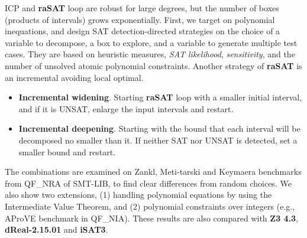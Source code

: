 \documentclass[runningheads,a4paper,oribibl]{llncs}
\newcommand{\suppress}[1]{} %
\begin{document}
ICP and {\bf raSAT} loop are robust for large degrees, but the number of boxes (products of intervals) 
grows exponentially. 
First, we target on polynomial inequations, and design SAT detection-directed strategies on 
the choice of a variable to decompose, a box to explore, and a variable to generate multiple test cases. 
They are based on heuristic measures, {\em SAT likelihood}, {\em sensitivity}, and the number of 
unsolved atomic polynomial constraints.
Another strategy of {\bf raSAT} is an incremental avoiding local optimal. 
\begin{itemize}
\item {\bf Incremental widening}. 
Starting {\bf raSAT} loop with a smaller initial interval, and if it is UNSAT, enlarge the input intervals
and restart. 
\item {\bf Incremental deepening}. 
Starting with the bound that each interval will be decomposed no smaller than it. 
If neither SAT nor UNSAT is detected, set a smaller bound and restart. 
\end{itemize} 
The combinations are examined on Zankl, Meti-tarski and Keymaera benchmarks from 
QF\_NRA of SMT-LIB, to find clear differences from random choices. 
We also show two extensions, (1) handling polynomial equations by using the Intermediate Value Theorem, 
and (2) polynomial constraints over integers (e.g., AProVE benchmark in QF\_NIA). 
These results are also compared with {\bf Z3 4.3}, \textbf{dReal-2.15.01} and {\bf iSAT3}. 

\suppress{
ICP is robust for larger degrees, but the number of boxes (products of intervals) to explore 
exponentially explodes when variables increase. 
Thus, design of strategies for selecting variables to decompose and boxes to explore is crucial 
for efficiency. Our strategy design is, 
\begin{itemize}
\item a box with more possibility to be SAT is selected to explore, which is estimated by 
several heuristic measures, called {\em SAT likelihood}, 
and the number of unsolved atomic polynomial constraints, and
\item a more influential variable is selected for multiple test cases and decomposition, 
which is estimated by {\em sensitivity}. 
\end{itemize} 
}
\end{document}
